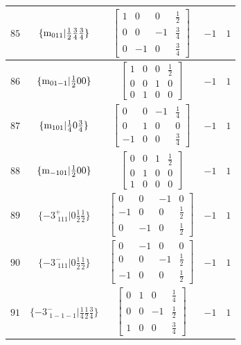 \documentclass[fleqn,8pt]{jsarticle}
\begin{document}
\begin{longtable}{ccccc}
$ 85 $ & $ \{{\rm m}_{011}|\frac{1}{2} \frac{3}{4} \frac{3}{4}\} $ & $ \begin{bmatrix} 1 & 0 & 0 & \frac{1}{2} \\ 0 & 0 & -1 & \frac{3}{4} \\ 0 & -1 & 0 & \frac{3}{4} \end{bmatrix} $ & $ -1 $ & $ 1 $ \\ \hline
$ 86 $ & $ \{{\rm m}_{01-1}|\frac{1}{2} 0 0\} $ & $ \begin{bmatrix} 1 & 0 & 0 & \frac{1}{2} \\ 0 & 0 & 1 & 0 \\ 0 & 1 & 0 & 0 \end{bmatrix} $ & $ -1 $ & $ 1 $ \\ \hline
$ 87 $ & $ \{{\rm m}_{101}|\frac{1}{4} 0 \frac{3}{4}\} $ & $ \begin{bmatrix} 0 & 0 & -1 & \frac{1}{4} \\ 0 & 1 & 0 & 0 \\ -1 & 0 & 0 & \frac{3}{4} \end{bmatrix} $ & $ -1 $ & $ 1 $ \\ \hline
$ 88 $ & $ \{{\rm m}_{-101}|\frac{1}{2} 0 0\} $ & $ \begin{bmatrix} 0 & 0 & 1 & \frac{1}{2} \\ 0 & 1 & 0 & 0 \\ 1 & 0 & 0 & 0 \end{bmatrix} $ & $ -1 $ & $ 1 $ \\ \hline
$ 89 $ & $ \{-3^{+}_{\,\,111}|0 \frac{1}{2} \frac{1}{2}\} $ & $ \begin{bmatrix} 0 & 0 & -1 & 0 \\ -1 & 0 & 0 & \frac{1}{2} \\ 0 & -1 & 0 & \frac{1}{2} \end{bmatrix} $ & $ -1 $ & $ 1 $ \\ \hline
$ 90 $ & $ \{-3^{-}_{\,\,111}|0 \frac{1}{2} \frac{1}{2}\} $ & $ \begin{bmatrix} 0 & -1 & 0 & 0 \\ 0 & 0 & -1 & \frac{1}{2} \\ -1 & 0 & 0 & \frac{1}{2} \end{bmatrix} $ & $ -1 $ & $ 1 $ \\ \hline
$ 91 $ & $ \{-3^{-}_{\,\,1-1-1}|\frac{1}{4} \frac{1}{2} \frac{3}{4}\} $ & $ \begin{bmatrix} 0 & 1 & 0 & \frac{1}{4} \\ 0 & 0 & -1 & \frac{1}{2} \\ 1 & 0 & 0 & \frac{3}{4} \end{bmatrix} $ & $ -1 $ & $ 1 $ \\ \hline

\end{longtable}
\end{document}
